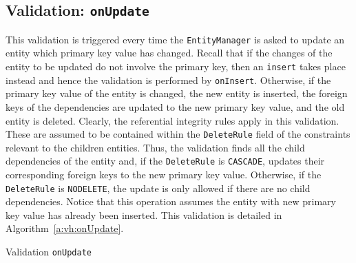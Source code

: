 	\subsection{Validation: \texttt{onUpdate}}
		This validation is triggered every time the \texttt{EntityManager} is asked to
		update an entity which primary key value has changed. Recall that if the
		changes of the entity to  be updated do not involve the primary key, then an
		\texttt{insert} takes place instead and hence the validation is performed by
		\texttt{onInsert}. Otherwise, if the primary key value of the entity is
		changed, the new entity is  inserted, the foreign keys of the dependencies are
		updated to the new primary key value, and the old entity is deleted.
		 Clearly, the referential integrity rules apply in this validation. These are 
		 assumed to be contained within the  \texttt{DeleteRule} field of the
		 constraints relevant to the children entities.  Thus, the validation finds
		  all the child dependencies of the entity and, if the \texttt{DeleteRule} is
		  \texttt{CASCADE}, updates their corresponding foreign keys to the new
		  primary key value. Otherwise, if the \texttt{DeleteRule} is
		  \texttt{NODELETE}, the update is only allowed if there are no child
		  dependencies. Notice that this operation assumes the entity with new primary
		  key value has already been inserted. This validation is detailed in
		  Algorithm~\ref{a:vh:onUpdate}.
		
		\begin{algorithm}[H]
			\caption{Validation \texttt{onUpdate}}\label{a:vh:onUpdate}
		\end{algorithm}
		

